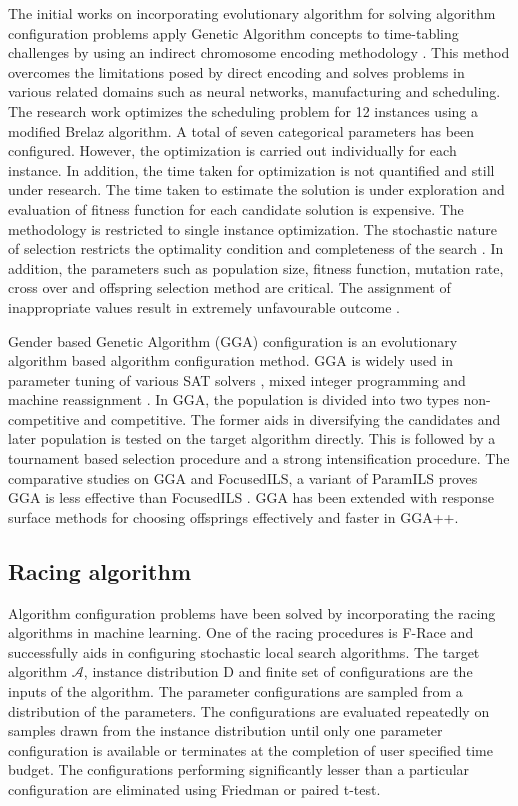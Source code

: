 The initial works on incorporating evolutionary algorithm for solving algorithm configuration problems apply Genetic Algorithm concepts to time-tabling challenges by using an indirect chromosome encoding methodology \cite{GA_Terashima_1999}. This method overcomes the limitations posed by direct encoding and solves problems in various related domains such as neural networks, manufacturing and scheduling. The research work optimizes the scheduling problem for 12 instances using a modified Brelaz algorithm. A total of seven categorical parameters has been configured. However, the optimization is carried out individually for each instance. In addition, the time taken for optimization is not quantified and still under research. The time taken to estimate the solution is under exploration \cite{AAC_Mainreview} and evaluation of fitness function for each candidate solution is expensive. The methodology is restricted to single instance optimization. The stochastic nature of selection restricts the optimality condition and completeness of the search \cite{Russell_Norvig}. In addition, the parameters such as population size, fitness function, mutation rate, cross over and offspring selection method are critical. The assignment of inappropriate values result in extremely unfavourable outcome \cite{GA_disadv1} \cite{GA_disadv2}.

Gender based Genetic Algorithm (GGA) configuration is an evolutionary algorithm based algorithm configuration method. GGA is widely used in parameter tuning of various SAT solvers \cite{GGA_application1}, mixed integer programming \cite{GGA_application1} and machine reassignment \cite{GGA_application2}. In GGA, the population is divided into two types non-competitive and competitive. The former aids in diversifying the candidates and later population is tested on the target algorithm directly. This is followed by a tournament based selection procedure and a strong intensification procedure. The comparative studies on GGA and FocusedILS, a variant of ParamILS proves GGA is less effective than FocusedILS \cite{SMAC_extendedpaper}. GGA has been extended with response surface methods for choosing offsprings effectively and faster in GGA++\cite{Modelbased_GGA}. 

\subsection{Racing algorithm}

Algorithm configuration problems have been solved by incorporating the racing algorithms in machine learning. One of the racing procedures is F-Race \cite{FRace_paper} and successfully aids in configuring stochastic local search algorithms. The target algorithm $\mathcal{A}$, instance distribution D and finite set of configurations are the inputs of the algorithm. The parameter configurations are sampled from a distribution of the parameters. The configurations are evaluated repeatedly on samples drawn from the instance distribution until only one parameter configuration is available or terminates at the completion of user specified time budget. The configurations performing significantly lesser than a particular configuration are eliminated using Friedman or paired t-test. 

